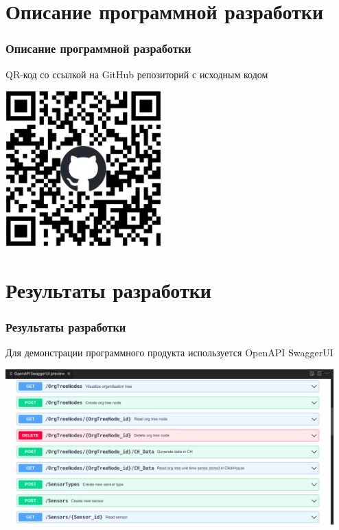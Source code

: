 \documentclass[pdf, hyperref={unicode}, aspectratio=169]{beamer}
\begin{document}
\section{Описание программной разработки}
\begin{frame}
	\frametitle{Описание программной разработки}
	
	QR-код со ссылкой на GitHub репозиторий с исходным кодом
	
	\begin{center}
		\includegraphics[height = 6cm]{qr-git.eps}
	\end{center}
\end{frame}





\section{Результаты разработки}
\begin{frame}
	\frametitle{Результаты разработки}
	
	Для демонстрации программного продукта используется OpenAPI SwaggerUI
	
	\begin{center}
		\includegraphics[height = 6cm]{swagger1.png}
	\end{center}
\end{frame}
\end{document}
